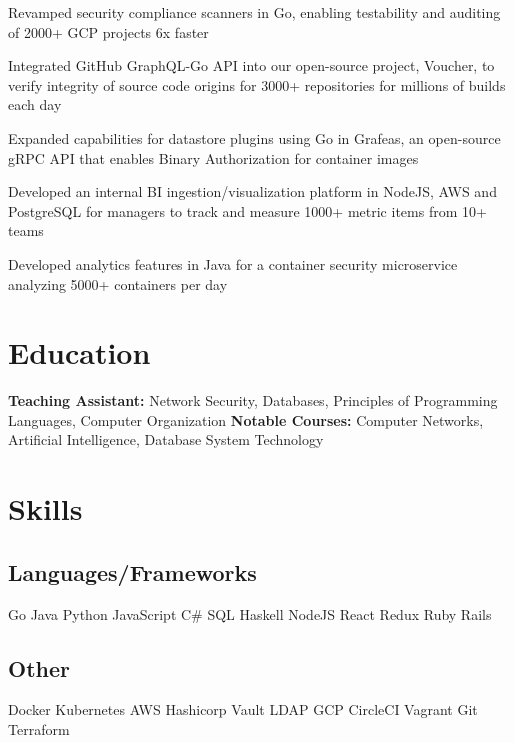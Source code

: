 \documentclass[]{deedy-resume}
\begin{document}
\begin{tightemize}
\item Revamped security compliance scanners in Go, enabling testability and auditing of 2000+ GCP projects 6x faster
\item Integrated GitHub GraphQL-Go API into our open-source project, Voucher, to verify integrity of source code origins for 3000+ repositories for millions of builds each day
\item Expanded capabilities for datastore plugins using Go in Grafeas, an open-source gRPC API that enables Binary Authorization for container images
\end{tightemize}
\sectionsep

\begin{tightemize}
\item Developed an internal BI ingestion/visualization platform in NodeJS, AWS and PostgreSQL for managers to track and measure 1000+ metric items from 10+ teams
\item Developed analytics features in Java for a container security microservice analyzing 5000+ containers per day
\end{tightemize}
\sectionsep

\section{Education}

\textbf{Teaching Assistant:} Network Security, Databases, Principles of Programming Languages, Computer Organization
\newline
\textbf{Notable Courses:} Computer Networks, Artificial Intelligence, Database System Technology
\sectionsep

\section{Skills}
\begin{minipage}[t]{1.0\textwidth}
\subsection{Languages/Frameworks}
Go \textbullet{} Java \textbullet{} Python \textbullet{} JavaScript \textbullet{}
C\# \textbullet{} SQL \textbullet{} Haskell \textbullet{}
NodeJS \textbullet{} React \textbullet{} Redux \textbullet{} Ruby \textbullet{} Rails
\sectionsep
\subsection{Other}
Docker \textbullet{} Kubernetes \textbullet{} AWS \textbullet{} Hashicorp Vault \textbullet{} LDAP \textbullet{} GCP
\textbullet{} CircleCI \textbullet{} Vagrant \textbullet{} Git \textbullet{} Terraform
\sectionsep
\end{minipage}
\hfill
\end{document}
